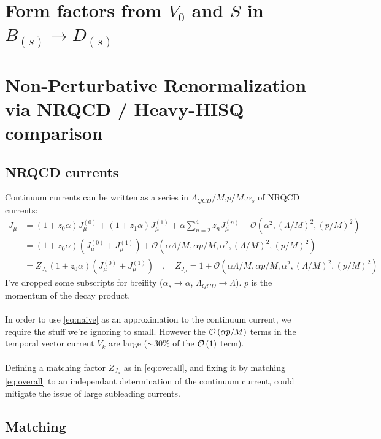 \section{Form factors from $V_0$ and $S$ in $B_{(s)}\to D_{(s)}$}

\section{Non-Perturbative Renormalization via NRQCD / Heavy-HISQ comparison}
\label{sec:Bcetac}

\subsection{NRQCD currents}

Continuum currents can be written as a series in $\Lambda_{QCD}/M$,$p/M$,$\alpha_s$ of NRQCD currents:
\begin{align}
	J_{\mu} &= ( 1 + z_0 \alpha ) J_{\mu}^{(0)} + ( 1 + z_1 \alpha ) J_{\mu}^{(1)} + \alpha \sum_{n=2}^4 z_n J_{\mu}^{(n)} + \mathcal{O}( \alpha^2, (\Lambda/M)^2, (p/M)^2 ) \\
	\label{eq:naive}	
	&= ( 1 + z_0 \alpha )( J_{\mu}^{(0)} + J_{\mu}^{(1)} ) + \mathcal{O}( \alpha \Lambda / M, \alpha p/M,  \alpha^2, (\Lambda/M)^2, (p/M)^2 ) \\
	&= Z_{J_{\mu}}(1 + z_0 \alpha)( J_{\mu}^{(0)} + J_{\mu}^{(1)} ) \quad,\quad Z_{J_{\mu}} = 1 + \mathcal{O}(\alpha \Lambda /M, \alpha p/M, \alpha^2, (\Lambda/M)^2, (p/M)^2 )
	\label{eq:overall}
\end{align}
I've dropped some subscripts for breifity ($\alpha_s\to \alpha$, $\Lambda_{QCD}\to\Lambda$). $p$ is the momentum of the decay product.
\\ \\
In order to use \eqref{eq:naive} as an approximation to the continuum current, we require the stuff we're ignoring to small. However the $\mathcal{O}\left( \alpha p /M \right)$ terms in the temporal vector current $V_k$ are large ($\sim 30\%$ of the $\mathcal{O}\left( 1 \right)$ term).
\\ \\
Defining a matching factor $Z_{J_{\mu}}$ as in \eqref{eq:overall}, and fixing it by matching \eqref{eq:overall} to an independant determination of the continuum current, could mitigate the issue of large subleading currents. 

\subsection{Matching}


